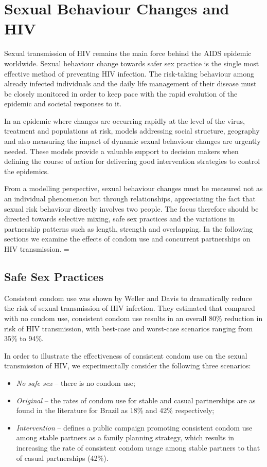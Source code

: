 \section{Sexual Behaviour Changes and HIV}

Sexual transmission of HIV remains the main force behind the AIDS epidemic worldwide.
Sexual behaviour change towards safer sex practice is the single most effective method of
preventing HIV infection. The risk-taking behaviour among already infected individuals
and the daily life management of their disease must be closely monitored in order to keep
pace with the rapid evolution of the epidemic and societal responses to it.

In an epidemic where changes are occurring rapidly at the level of the virus, treatment
and populations at risk, models addressing social structure, geography and also measuring
the impact of dynamic sexual behaviour changes are urgently needed. These models provide
a valuable support to decision makers when defining the course of action for delivering
good intervention strategies to control the epidemics.

\parskip=13pt
From a modelling perspective, sexual behaviour changes must be measured not as an
individual phenomenon but through relationships, appreciating the fact that sexual risk
behaviour directly involves two people. The focus therefore should be directed towards
selective mixing, safe sex practices and the variations in partnership patterns such as
length, strength and overlapping. In the following sections we examine the effects of
condom use and concurrent partnerships on HIV transmission.
\parskip=\baselineskip

\subsection{Safe Sex Practices}

Consistent condom use was shown by Weller and Davis \cite{Davis1999,Weller2004} to
dramatically reduce the risk of sexual transmission of HIV infection. They estimated that
compared with no condom use, consistent condom use results in an overall 80\% reduction
in risk of HIV transmission, with best-case and worst-case scenarios ranging from 35\% to
94\%.

In order to illustrate the effectiveness of consistent condom use on the sexual
transmission of HIV, we experimentally consider the following three scenarios:
\parskip=0pt
\begin{itemize}
    \item \emph{No safe sex} -- there is no condom use;
    \item \emph{Original}    -- the rates of condom use for stable and casual partnerships
    are as found in the literature for Brazil as 18\% and 42\% respectively;
    \item \emph{Intervention} -- defines a public campaign promoting consistent condom
    use among stable partners as a family planning strategy, which results in increasing
    the rate of consistent condom usage among stable partners to that of casual partnerships (42\%).
\end{itemize}

